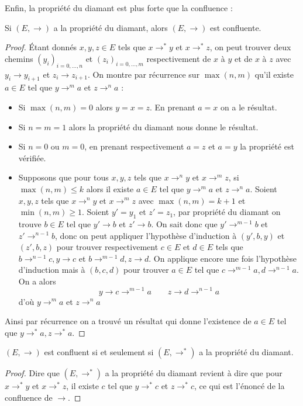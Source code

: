 Enfin, la propriété du diamant est plus forte que la confluence :

\begin{prop}
    Si $(E,\to)$ a la propriété du diamant, alors $(E,\to)$ est confluente.
\end{prop}

\begin{proof}
    \'Etant donnés $x,y,z\in E$ tels que $x\to^* y$ et $x\to^* z$, on peut trouver deux chemins $(y_i)_{i=0,\ldots,n}$ et $(z_i)_{i=0,\ldots,m}$ respectivement de $x$ à $y$ et de $x$ à $z$ avec $y_i\to y_{i+1}$ et $z_i\to z_{i+1}$. On montre par récurrence sur $\max(n,m)$ qu'il existe $a\in E$ tel que $y\to^m a$ et $z\to^n a$ :
    \begin{itemize}[label=$\bullet$]
        \item Si $\max(n,m) = 0$ alors $y=x=z$. En prenant $a = x$ on a le résultat.
        \item Si $n = m = 1$ alors la propriété du diamant nous donne le résultat.
        \item Si $n = 0$ ou $m = 0$, en prenant respectivement $a = z$ et $a = y$ la propriété est vérifiée.
        \item Supposons que pour tous $x,y,z$ tels que $x\to^n y$ et $x\to^m z$, si $\max(n,m) \leq k$ alors il existe $a\in E$ tel que $y\to^m a$ et $z\to^n a$. Soient $x,y,z$ tels que $x\to^n y$ et $x\to^m z$ avec $\max(n,m) = k+1$ et $\min(n,m) \geq 1$. Soient $y' = y_1$ et $z'=z_1$, par propriété du diamant on trouve $b\in E$ tel que $y'\to b$ et $z'\to b$. On sait donc que $y'\to^{m-1} b$ et $z'\to^{n-1} b$, donc on peut appliquer l'hypothèse d'induction à $(y',b,y)$ et $(z',b,z)$ pour trouver respectivement $c\in E$ et $d\in E$ tels que $b\to^{n-1} c,y\to c$ et $b\to^{m-1} d, z\to d$. On applique encore une fois l'hypothèse d'induction mais à $(b,c,d)$ pour trouver $a\in E$ tel que $c\to^{m-1} a, d\to^{n-1} a$. On a alors 
        $$y\to c\to^{m-1} a\qquad z\to d\to^{n-1} a$$ d'où $y\to^m a$ et $z\to^n a$
    \end{itemize}
    Ainsi par récurrence on a trouvé un résultat qui donne l'existence de $a\in E$ tel que $y\to^* a,z\to^*a$.
\end{proof}

\begin{prop}
    $(E,\to)$ est confluent si et seulement si $(E,\to^*)$ a la propriété du diamant.
\end{prop}

\begin{proof}
    Dire que $(E,\to^*)$ a la propriété du diamant revient à dire que pour $x\to^* y$ et $x\to^* z$, il existe $c$ tel que $y\to^* c$ et $z\to^* c$, ce qui est l'énoncé de la confluence de $\to$.
\end{proof}

